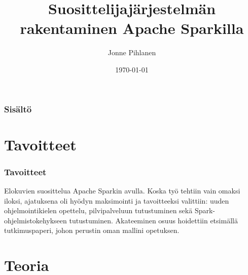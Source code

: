 \documentclass{beamer}
\title[Short title]{Suosittelijajärjestelmän rakentaminen Apache Sparkilla} %
\author{Jonne Pihlanen} %
\institute[TUT] %
{
Tampereen Teknillinen Yliopisto \\ %
\medskip
\textit{jonne.pihlanen@student.tut.fi} %
}
\date{\today} %
\begin{document}
\begin{frame}
\titlepage %
\end{frame}

\begin{frame}
\frametitle{Sisältö} %
\tableofcontents %
\end{frame}


\section{Tavoitteet}

\begin{frame}
\frametitle{Tavoitteet}

Elokuvien suosittelua Apache Sparkin avulla.
Koska työ tehtiin vain omaksi iloksi, ajatuksena oli hyödyn maksimointi ja tavoitteeksi valittiin: uuden ohjelmointikielen opettelu, pilvipalveluun tutustuminen sekä Spark-ohjelmistokehykseen tutustuminen.
Akateeminen osuus hoidettiin etsimällä tutkimuspaperi, johon perustin oman mallini opetuksen.

\end{frame}


\section{Teoria}
\end{document}
